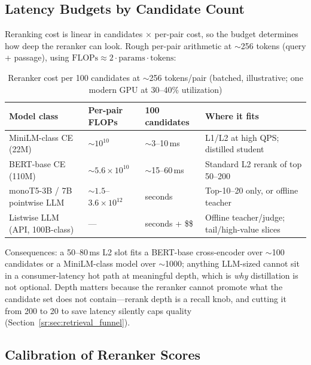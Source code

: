 \subsection{Latency Budgets by Candidate Count}
\label{sr:subsec:reranker_latency}

Reranking cost is linear in candidates $\times$ per-pair cost, so the budget determines how deep the reranker can look. Rough per-pair arithmetic at $\sim$256 tokens (query + passage), using $\text{FLOPs} \approx 2 \cdot \text{params} \cdot \text{tokens}$:

\begin{table}[H]
\centering
\small
\caption{Reranker cost per 100 candidates at $\sim$256 tokens/pair (batched, illustrative; one modern GPU at 30--40\% utilization)}
\label{sr:tab:reranker_latency}
\begin{tabularx}{\textwidth}{lXXX}
\toprule
\textbf{Model class} & \textbf{Per-pair FLOPs} & \textbf{100 candidates} & \textbf{Where it fits} \\
\midrule
MiniLM-class CE (22M) & $\sim$$10^{10}$ & $\sim$3--10\,ms & L1/L2 at high QPS; distilled student \\
BERT-base CE (110M) & $\sim$$5.6 \times 10^{10}$ & $\sim$15--60\,ms & Standard L2 rerank of top 50--200 \\
monoT5-3B / 7B pointwise LLM & $\sim$$1.5$--$3.6 \times 10^{12}$ & seconds & Top-10--20 only, or offline teacher \\
Listwise LLM (API, 100B-class) & --- & seconds + \$\$ & Offline teacher/judge; tail/high-value slices \\
\bottomrule
\end{tabularx}
\end{table}

Consequences: a 50--80\,ms L2 slot fits a BERT-base cross-encoder over $\sim$100 candidates or a MiniLM-class model over $\sim$1000; anything LLM-sized cannot sit in a consumer-latency hot path at meaningful depth, which is \textit{why} distillation is not optional. Depth matters because the reranker cannot promote what the candidate set does not contain---rerank depth is a recall knob, and cutting it from 200 to 20 to save latency silently caps quality (Section~\ref{sr:sec:retrieval_funnel}).

\subsection{Calibration of Reranker Scores}
\label{sr:subsec:reranker_calibration}

